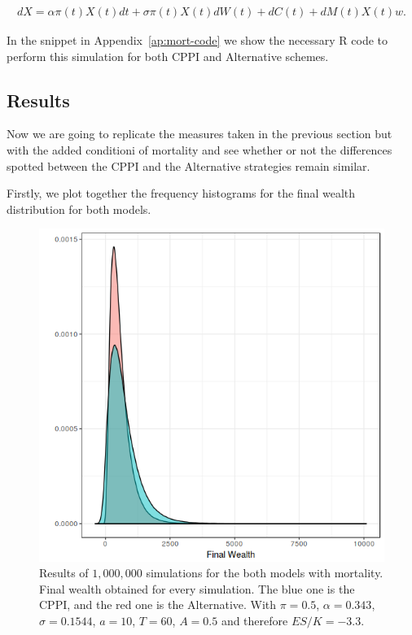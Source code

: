 \begin{align}
	dX = \alpha \pi(t)X(t)dt + \sigma \pi(t)X(t)dW(t) + dC(t) + dM(t)X(t)w \textit{.}
\end{align}

In the snippet in Appendix~\ref{ap:mort-code} we show the necessary R code to perform this simulation for both CPPI and Alternative schemes.

\subsection{Results}

Now we are going to replicate the measures taken in the previous section but with the added conditioni of mortality and see whether or not the differences spotted between the CPPI and the Alternative strategies remain similar.

Firstly, we plot together the frequency histograms for the final wealth distribution for
both models.

\begin{figure}[h]
    \centering
    \includegraphics[scale=0.75]{./images/mort_final_wealth.png}
    \caption{Results of $1,000,000$ simulations for the both models with mortality. Final wealth obtained for every simulation. The blue one is the CPPI, and the red one is the Alternative. With $\pi = 0.5$, $\alpha = 0.343$, $\sigma = 0.1544$, $a = 10$, $T = 60$, $A = 0.5$ and therefore $ES/K = -3.3$.}
    \label{fig:mort_fw}
\end{figure}


